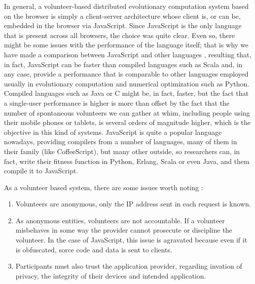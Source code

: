 \documentclass[journal,onecolumn]{IEEEtran}
\begin{document}
In general, a volunteer-based distributed evolutionary computation
system based on the browser is simply a client-server architecture
whose client is, or can be, embedded in the browser via
JavaScript. Since JavaScript is  the only language that is present
across all browsers, the choice was quite clear. Even so, there might
be some issues with the performance of the language itself; that is
why we have made a comparison between JavaScript and other languages
\cite{2015arXiv151101088M}, resulting that, in fact, JavaScript can be
faster than compiled languages such as Scala and, in any case, provide
a performance that is comparable to other languages employed usually
in evolutionary computation and numerical optimization such as Python. Compiled languages such as
Java or C might be, in fact, faster, but the fact that a single-user
performance is higher is more than offset by the fact that the number
of spontaneous volunteers we can gather at whim, including people
using their mobile phones or tablets, is several orders of magnitude
higher, which is the objective in this kind of systems. JavaScript is
quite a popular language nowadays, providing compilers from a number
of languages, many of them in their family (like CoffeeScript), but
many other outside, so researchers can, in fact, write their fitness
function in Python, Erlang, Scala or even Java, and them compile it to
JavaScript. 

As a volunteer based system, there are some issues worth 
noting \cite{sarmenta2001volunteer,web:BOINC} :\begin{enumerate}
\item Volunteers are anonymous, only the IP address sent in 
each request is known.
\item As anonymous entities, volunteers are not accountable. 
If a volunteer misbehaves in some way the provider cannot 
prosecute or discipline the volunteer. In the case of JavaScript,
this issue is agravated because even if it is obfuscated, sorce code
and data is sent to clients. 
\item Participants must also trust the application provider, 
regarding invation of privacy, the integrity of their devices 
and intended application. 
\end{enumerate}
\end{document}
